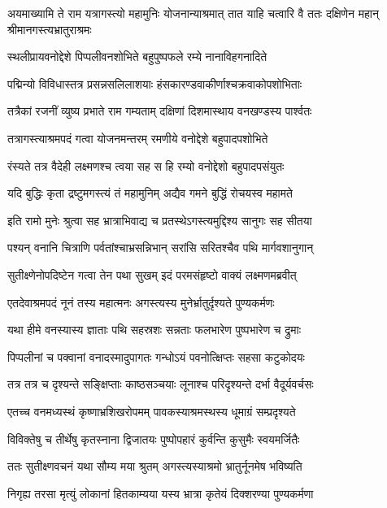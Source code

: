 \threelineshloka
{अयमाख्यामि ते राम यत्रागस्त्यो महामुनिः}
{योजनान्याश्रमात् तात याहि चत्वारि वै ततः}
{दक्षिणेन महान् श्रीमानगस्त्यभ्रातुराश्रमः} %

\twolineshloka
{स्थलीप्रायवनोद्देशे पिप्पलीवनशोभिते}
{बहुपुष्पफले रम्ये नानाविहगनादिते} %

\twolineshloka
{पद्मिन्यो विविधास्तत्र प्रसन्नसलिलाशयाः}
{हंसकारण्डवाकीर्णाश्चक्रवाकोपशोभिताः} %

\twolineshloka
{तत्रैकां रजनीं व्युष्य प्रभाते राम गम्यताम्}
{दक्षिणां दिशमास्थाय वनखण्डस्य पार्श्वतः} %

\twolineshloka
{तत्रागस्त्याश्रमपदं गत्वा योजनमन्तरम्}
{रमणीये वनोद्देशे बहुपादपशोभिते} %

\twolineshloka
{रंस्यते तत्र वैदेही लक्ष्मणश्च त्वया सह}
{स हि रम्यो वनोद्देशो बहुपादपसंयुतः} %

\twolineshloka
{यदि बुद्धिः कृता द्रष्टुमगस्त्यं तं महामुनिम्}
{अद्यैव गमने बुद्धिं रोचयस्व महामते} %

\twolineshloka
{इति रामो मुनेः श्रुत्वा सह भ्रात्राभिवाद्य च}
{प्रतस्थेऽगस्त्यमुद्दिश्य सानुगः सह सीतया} %

\twolineshloka
{पश्यन् वनानि चित्राणि पर्वतांश्चाभ्रसन्निभान्}
{सरांसि सरितश्चैव पथि मार्गवशानुगान्} %

\twolineshloka
{सुतीक्ष्णेनोपदिष्टेन गत्वा तेन पथा सुखम्}
{इदं परमसंहृष्टो वाक्यं लक्ष्मणमब्रवीत्} %

\twolineshloka
{एतदेवाश्रमपदं नूनं तस्य महात्मनः}
{अगस्त्यस्य मुनेर्भ्रातुर्दृश्यते पुण्यकर्मणः} %

\twolineshloka
{यथा हीमे वनस्यास्य ज्ञाताः पथि सहस्रशः}
{सन्नताः फलभारेण पुष्पभारेण च द्रुमाः} %

\twolineshloka
{पिप्पलीनां च पक्वानां वनादस्मादुपागतः}
{गन्धोऽयं पवनोत्क्षिप्तः सहसा कटुकोदयः} %

\twolineshloka
{तत्र तत्र च दृश्यन्ते सङ्क्षिप्ताः काष्ठसञ्चयाः}
{लूनाश्च परिदृश्यन्ते दर्भा वैदूर्यवर्चसः} %

\twolineshloka
{एतच्च वनमध्यस्थं कृष्णाभ्रशिखरोपमम्}
{पावकस्याश्रमस्थस्य धूमाग्रं सम्प्रदृश्यते} %

\twolineshloka
{विविक्तेषु च तीर्थेषु कृतस्नाना द्विजातयः}
{पुष्पोपहारं कुर्वन्ति कुसुमैः स्वयमर्जितैः} %

\twolineshloka
{ततः सुतीक्ष्णवचनं यथा सौम्य मया श्रुतम्}
{अगस्त्यस्याश्रमो भ्रातुर्नूनमेष भविष्यति} %

\twolineshloka
{निगृह्य तरसा मृत्युं लोकानां हितकाम्यया}
{यस्य भ्रात्रा कृतेयं दिक्शरण्या पुण्यकर्मणा} %

